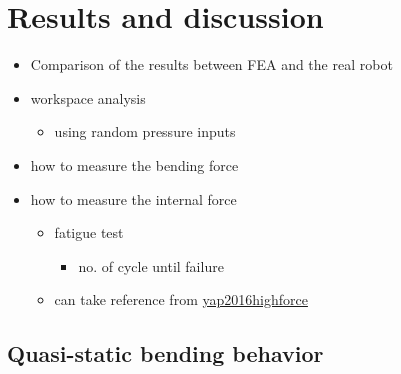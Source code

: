 \documentclass[journal,onecolumn]{IEEEtran}
\begin{document}
\section{Results and discussion}
\label{sec:org21b22ba}
\begin{itemize}
\item Comparison of the results between FEA and the real robot

\item workspace analysis
\begin{itemize}
\item using random pressure inputs
\end{itemize}
\item how to measure the bending force
\item how to measure the internal force
\begin{itemize}
\item fatigue test
\begin{itemize}
\item no. of cycle until failure
\end{itemize}
\item can take reference from \href{file:///Users/Denny/paper_lib/High-Force Soft Printable Pneumatics for Soft Robotic Applications.pdf}{yap2016highforce}
\end{itemize}
\end{itemize}

\subsection{Quasi-static bending behavior}
\label{sec:org904213d}
\end{document}
